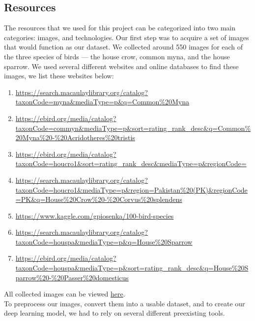 \documentclass[11pt]{article}
\begin{document}
\subsection{Resources}
  The resources that we used for this project can be categorized into two main 
  categories: images, and technologies. Our first step was to acquire a set of images that would 
  function as our dataset. We collected around 550 images for each of the three 
  species of birds --- the house crow, common myna, and the house sparrow. We used 
  several different websites and online databases to find these images, we list 
  these websites below: 
  \begin{enumerate}
    \item \url{https://search.macaulaylibrary.org/catalog?taxonCode=myna&mediaType=p&q=Common\%20Myna}
    \item \url{https://ebird.org/media/catalog?taxonCode=commyn&mediaType=p&sort=rating_rank_desc&q=Common\%20Myna\%20-\%20Acridotheres\%20tristis}
    \item \url{https://ebird.org/media/catalog?taxonCode=houcro1&sort=rating_rank_desc&mediaType=p&regionCode=}
    \item \url{https://search.macaulaylibrary.org/catalog?taxonCode=houcro1&mediaType=p&region=Pakistan\%20(PK)&regionCode=PK&q=House\%20Crow\%20-\%20Corvus\%20splendens}
    \item \url{https://www.kaggle.com/gpiosenka/100-bird-species}
    \item \url{https://search.macaulaylibrary.org/catalog?taxonCode=houspa&mediaType=p&q=House\%20Sparrow}
    \item \url{https://ebird.org/media/catalog?taxonCode=houspa&mediaType=p&sort=rating_rank_desc&q=House\%20Sparrow\%20-\%20Passer\%20domesticus}
    \label{imagelinks}
  \end{enumerate}
  \setlength{\parskip}{1em}
  All collected images can be viewed \hyperlink{https://drive.google.com/drive/folders/18k-roE_VJSB1dcrhvN1y_EosVF7Kb0dY?usp=sharing}{here}.\\
  To preprocess our images, convert them into a usable dataset, and to create
  our deep learning model, we had to rely on several different preexisting tools.
\end{document}
